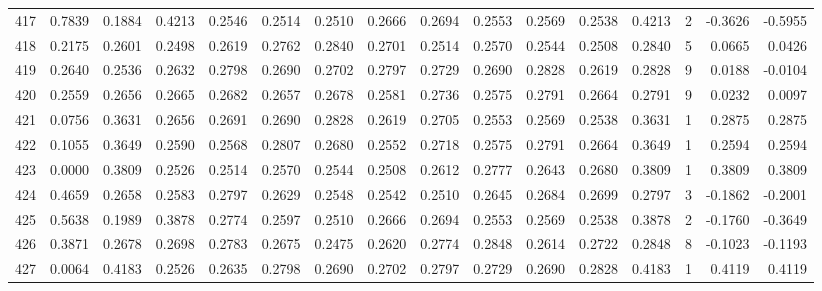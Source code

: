 \begin{tabular}{lrrrrrrrrrrrrrrr}
417 &      0.7839 &  0.1884 &  0.4213 &  0.2546 &  0.2514 &  0.2510 &  0.2666 &  0.2694 &  0.2553 &  0.2569 &   0.2538 &     0.4213 &      2 &                   -0.3626 &                    -0.5955 \\
418 &      0.2175 &  0.2601 &  0.2498 &  0.2619 &  0.2762 &  0.2840 &  0.2701 &  0.2514 &  0.2570 &  0.2544 &   0.2508 &     0.2840 &      5 &                    0.0665 &                     0.0426 \\
419 &      0.2640 &  0.2536 &  0.2632 &  0.2798 &  0.2690 &  0.2702 &  0.2797 &  0.2729 &  0.2690 &  0.2828 &   0.2619 &     0.2828 &      9 &                    0.0188 &                    -0.0104 \\
420 &      0.2559 &  0.2656 &  0.2665 &  0.2682 &  0.2657 &  0.2678 &  0.2581 &  0.2736 &  0.2575 &  0.2791 &   0.2664 &     0.2791 &      9 &                    0.0232 &                     0.0097 \\
421 &      0.0756 &  0.3631 &  0.2656 &  0.2691 &  0.2690 &  0.2828 &  0.2619 &  0.2705 &  0.2553 &  0.2569 &   0.2538 &     0.3631 &      1 &                    0.2875 &                     0.2875 \\
422 &      0.1055 &  0.3649 &  0.2590 &  0.2568 &  0.2807 &  0.2680 &  0.2552 &  0.2718 &  0.2575 &  0.2791 &   0.2664 &     0.3649 &      1 &                    0.2594 &                     0.2594 \\
423 &      0.0000 &  0.3809 &  0.2526 &  0.2514 &  0.2570 &  0.2544 &  0.2508 &  0.2612 &  0.2777 &  0.2643 &   0.2680 &     0.3809 &      1 &                    0.3809 &                     0.3809 \\
424 &      0.4659 &  0.2658 &  0.2583 &  0.2797 &  0.2629 &  0.2548 &  0.2542 &  0.2510 &  0.2645 &  0.2684 &   0.2699 &     0.2797 &      3 &                   -0.1862 &                    -0.2001 \\
425 &      0.5638 &  0.1989 &  0.3878 &  0.2774 &  0.2597 &  0.2510 &  0.2666 &  0.2694 &  0.2553 &  0.2569 &   0.2538 &     0.3878 &      2 &                   -0.1760 &                    -0.3649 \\
426 &      0.3871 &  0.2678 &  0.2698 &  0.2783 &  0.2675 &  0.2475 &  0.2620 &  0.2774 &  0.2848 &  0.2614 &   0.2722 &     0.2848 &      8 &                   -0.1023 &                    -0.1193 \\
427 &      0.0064 &  0.4183 &  0.2526 &  0.2635 &  0.2798 &  0.2690 &  0.2702 &  0.2797 &  0.2729 &  0.2690 &   0.2828 &     0.4183 &      1 &                    0.4119 &                     0.4119 \\

\end{tabular}
